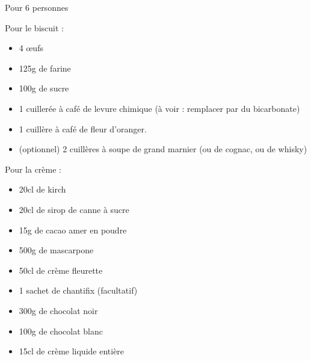 \bigskip
{}
{Pour 6 personnes}{Pour le biscuit :
\begin{itemize}
	\item 4 \oe ufs
	\item 125g de farine
	\item 100g de sucre
	\item 1 cuillerée à café de levure chimique (à voir : remplacer par du bicarbonate)
	\item 1 cuillère à café de fleur d'oranger.
	\item (optionnel) 2 cuillères à soupe de grand marnier (ou de cognac, ou de whisky)
\end{itemize}
Pour la crème :	
\begin{itemize}
	\item 20cl de kirch
	\item 20cl de sirop de canne à sucre
	\item 15g de cacao amer en poudre
	\item 500g de mascarpone
	\item 50cl de crème fleurette
	\item 1 sachet de chantifix (facultatif)
	\item 300g de chocolat noir
	\item 100g de chocolat blanc
	\item 15cl de crème liquide entière
\end{itemize}}
